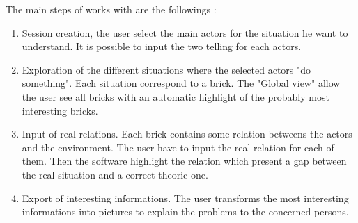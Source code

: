 The main steps of works with \tria are the followings : \\
\begin{enumerate}
\item Session creation, the user select the main actors for the situation he want to understand. It is possible to input the two telling for each actors.\\
\item Exploration of the different situations where the selected actors "do something". Each situation correspond to a brick. The "Global view" allow the user see all bricks with an automatic highlight of the probably most interesting bricks.\\
\item Input of real relations. Each brick contains some relation betweens the actors and the environment. The user have to input the real relation for each of them. Then the software highlight the relation which present a gap between the real situation and a correct theoric one.\\
\item Export of interesting informations. The user transforms the most interesting informations into pictures to explain the problems to the concerned persons.\\ 

\end{enumerate}



